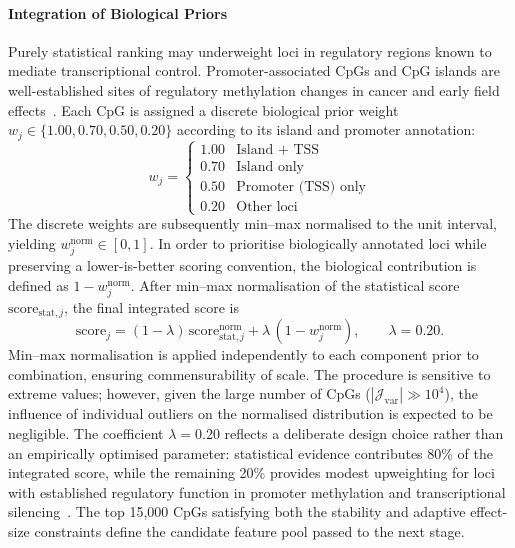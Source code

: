 \paragraph{Integration of Biological Priors}

Purely statistical ranking may underweight loci in 
regulatory regions known to mediate transcriptional 
control. Promoter-associated CpGs and CpG islands are 
well-established sites of regulatory methylation changes 
in cancer and early field 
effects~\cite{Hansen2011, Fleischer2017}. Each CpG is assigned a discrete biological prior weight 
$w_j \in \{1.00, 0.70, 0.50, 0.20\}$ according to its island 
and promoter annotation:
\begin{equation}
w_j =
\begin{cases}
1.00 & \text{Island + TSS} \\
0.70 & \text{Island only} \\
0.50 & \text{Promoter (TSS) only} \\
0.20 & \text{Other loci}
\end{cases}
\end{equation}
The discrete weights are subsequently min--max normalised 
to the unit interval, yielding $w_j^{\mathrm{norm}} \in [0,1]$. 
In order to prioritise biologically annotated loci while 
preserving a lower-is-better scoring convention, the 
biological contribution is defined as 
$1 - w_j^{\mathrm{norm}}$.
After min--max normalisation of the statistical score 
$\mathrm{score}_{\mathrm{stat},j}$, the final integrated score is
\begin{equation}
\mathrm{score}_{j}
=
(1 - \lambda)\,\mathrm{score}_{\mathrm{stat},j}^{\mathrm{norm}}
+
\lambda\,(1 - w_j^{\mathrm{norm}}),
\qquad
\lambda = 0.20.
\end{equation}
Min--max normalisation is applied independently to each 
component prior to combination, ensuring commensurability 
of scale. The procedure is sensitive to extreme values; 
however, given the large number of CpGs 
($|\mathcal{J}_{\mathrm{var}}| \gg 10^4$), the influence 
of individual outliers on the normalised distribution is 
expected to be negligible.
The coefficient $\lambda = 0.20$ reflects a deliberate design 
choice rather than an empirically optimised parameter: 
statistical evidence contributes 80\% of the integrated score, 
while the remaining 20\% provides modest upweighting for loci 
with established regulatory function in promoter methylation 
and transcriptional silencing~\cite{Jones2012}. The top 15,000 CpGs 
satisfying both the stability and adaptive effect-size 
constraints define the candidate feature pool passed to the 
next stage.

